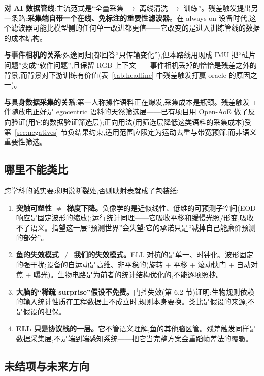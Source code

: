\documentclass[UTF8,12pt,a4paper]{ctexart}
\begin{document}
\textbf{对 AI 数据管线}:主流范式是``全量采集 $\to$ 离线清洗 $\to$ 训练''。残差触发提出另一条路:\textbf{采集端自带一个在线、免标注的重要性滤波器}。在 always-on 设备时代,这个滤波器可能比模型侧的任何单一改进都更值——它改变的是进入训练管线的数据的成本结构。

\textbf{与事件相机的关系}:殊途同归(都回答``只传输变化''),但本路线用现成 IMU 把``硅片问题''变成``软件问题'',且保留 RGB 上下文——事件相机丢掉的恰恰是残差之外的背景,而背景对下游训练有价值(表~\ref{tab:headline} 中残差触发打赢 oracle 的原因之一)。

\textbf{与具身数据采集的关系}:第一人称操作语料正在爆发,采集成本是瓶颈。残差触发 + 伴随放电正好是 egocentric 语料的天然筛选层——已有项目用 Open-AoE 做了反向验证(用它的数据验证筛选层);正向用法(用筛选层降低这类语料的采集成本)受第~\ref{sec:negatives} 节负结果约束,适用范围应限定为运动去重与带宽预筛,而非语义重要性筛选。

\subsection{哪里不能类比}

跨学科的诚实要求明说断裂处,否则映射表就成了包装纸:

\begin{enumerate}
  \item \textbf{突触可塑性 $\ne$ 梯度下降。}负像学的是近似线性、低维的可预测子空间(EOD 响应是固定波形的缩放);运行统计同理——它吸收平移和缓慢光照/形变,吸收不了语义。指望这一层``预测世界''会失望;它的承诺只是``减掉自己能廉价预测的部分''。
  \item \textbf{鱼的失效模式 $\ne$ 我们的失效模式。}ELL 对抗的是单一、时钟化、波形固定的强干扰;设备的自运动是高维、非平稳的(旋转 + 平移 + 滚动快门 + 自动对焦 + 曝光)。生物电路是为前者的统计结构优化的,不能逐项照抄。
  \item \textbf{大脑的``稀疏 surprise''假设不免费。}门控失效(第 6.2 节)证明:生物规则依赖的输入统计性质在工程数据上不成立时,规则本身要换。类比是假设的来源,不是假设的担保。
  \item \textbf{ELL 只是协议栈的一层。}它不管语义理解,鱼的其他脑区管。残差触发同样是数据采集层,不是端到端感知系统——把它当完整方案会重蹈帧差法的覆辙。
\end{enumerate}

\subsection{未结项与未来方向}
\end{document}
